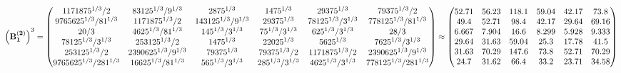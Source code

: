 \documentclass[10pt,a4paper]{article}
\begin{document}
	\[
		\left(\bold{B_1^{(2)}}\right)^{3} = 
		\begin{pmatrix}
			{{1171875^ {1 / 3}}} / {{2}} & {{8}{3125^ {1 / 3}}} / {{9^ {1 / 3}}} & {{28}{75^ {1 / 3}}}{} & {{14}{75^ {1 / 3}}}{} & {{2}{9375^ {1 / 3}}}{} & {{7}{9375^ {1 / 3}}} / {{2}} \\
			{{9765625^ {1 / 3}}} / {{81^ {1 / 3}}} & {{1171875^ {1 / 3}}} / {{2}} & {{14}{3125^ {1 / 3}}} / {{9^ {1 / 3}}} & {{2}{9375^ {1 / 3}}}{} & {{78125^ {1 / 3}}} / {{3^ {1 / 3}}} & {{7}{78125^ {1 / 3}}} / {{81^ {1 / 3}}} \\
			{{20}} / {{3}} & {{4}{625^ {1 / 3}}} / {{81^ {1 / 3}}} & {{14}{5^ {1 / 3}}} / {{3^ {1 / 3}}} & {{7}{5^ {1 / 3}}} / {{3^ {1 / 3}}} & {{625^ {1 / 3}}} / {{3^ {1 / 3}}} & {{28}} / {{3}} \\
			{{78125^ {1 / 3}}} / {{3^ {1 / 3}}} & {{253125^ {1 / 3}}} / {{2}} & {{14}{75^ {1 / 3}}}{} & {{2}{2025^ {1 / 3}}}{} & {{5625^ {1 / 3}}}{} & {{7}{625^ {1 / 3}}} / {{3^ {1 / 3}}} \\
			{{253125^ {1 / 3}}} / {{2}} & {{2}{390625^ {1 / 3}}} / {{9^ {1 / 3}}} & {{7}{9375^ {1 / 3}}}{} & {{7}{9375^ {1 / 3}}} / {{2}} & {{1171875^ {1 / 3}}} / {{2}} & {{2}{390625^ {1 / 3}}} / {{9^ {1 / 3}}} \\
			{{9765625^ {1 / 3}}} / {{2}{81^ {1 / 3}}} & {{16}{625^ {1 / 3}}} / {{81^ {1 / 3}}} & {{56}{5^ {1 / 3}}} / {{3^ {1 / 3}}} & {{28}{5^ {1 / 3}}} / {{3^ {1 / 3}}} & {{4}{625^ {1 / 3}}} / {{3^ {1 / 3}}} & {{7}{78125^ {1 / 3}}} / {{2}{81^ {1 / 3}}} \\
		\end{pmatrix}
		\approx
		\begin{pmatrix}
			52.71    & 56.23    & 118.1    & 59.04    & 42.17    & 73.8     \\
			49.4     & 52.71    & 98.4     & 42.17    & 29.64    & 69.16    \\
			6.667    & 7.904    & 16.6     & 8.299    & 5.928    & 9.333    \\
			29.64    & 31.63    & 59.04    & 25.3     & 17.78    & 41.5     \\
			31.63    & 70.29    & 147.6    & 73.8     & 52.71    & 70.29    \\
			24.7     & 31.62    & 66.4     & 33.2     & 23.71    & 34.58    \\
		\end{pmatrix}
	\]
\end{document}
